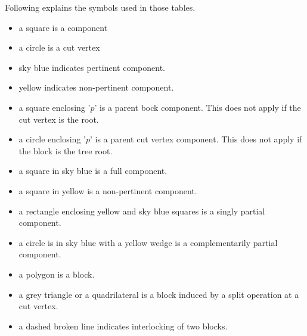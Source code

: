 \documentclass[a4]{jgaa-art}
\begin{document}
\begin{appendices}
   Following explains the symbols used in those tables.
   \begin {itemize}
   \item a square is a component
   \item a circle is a cut vertex
   \item sky blue indicates pertinent component.
   \item yellow indicates non-pertinent component.
   \item a square enclosing '$p$' is a parent bock component. 
This does not apply if the cut vertex is the root.
   \item a circle enclosing '$p$' is a parent cut vertex component.
This does not apply if the block is the tree root.
   \item a square in sky blue is a full component.
   \item a square in yellow is a non-pertinent component.
   \item a rectangle enclosing yellow and sky blue squares is a singly partial component.
   \item a circle is in sky blue with a yellow wedge is a complementarily partial component.
   \item a polygon is a block.
   \item a grey triangle or a quadrilateral is a block induced by a split operation at a cut vertex.
   \item a dashed broken line indicates interlocking of two blocks.
   \end {itemize}


\end{appendices}
\end{document}
